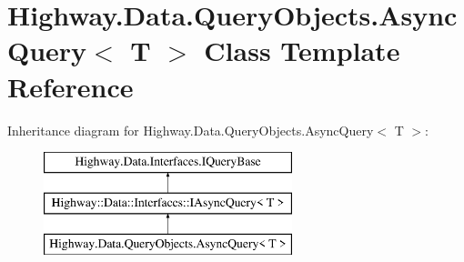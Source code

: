 \hypertarget{class_highway_1_1_data_1_1_query_objects_1_1_async_query-g}{\section{Highway.\-Data.\-Query\-Objects.\-Async\-Query$<$ T $>$ Class Template Reference}
\label{class_highway_1_1_data_1_1_query_objects_1_1_async_query-g}
}
Inheritance diagram for Highway.\-Data.\-Query\-Objects.\-Async\-Query$<$ T $>$\-:\begin{figure}[H]
\begin{center}
\leavevmode
\includegraphics[height=3.000000cm]{class_highway_1_1_data_1_1_query_objects_1_1_async_query-g}
\end{center}
\end{figure}
